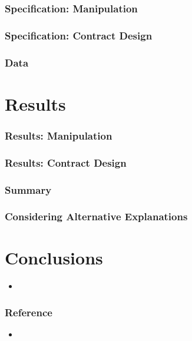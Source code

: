 \documentclass[dvipdfmx,12pt]{beamer}
\begin{document}
\begin{frame}\frametitle{Specification: Manipulation}

\end{frame}

\begin{frame}\frametitle{Specification: Contract Design}

\end{frame}

\begin{frame}\frametitle{Data}

\end{frame}

\section{Results}
\begin{frame}\frametitle{Results: Manipulation}

\end{frame}

\begin{frame}\frametitle{}

\end{frame}

\begin{frame}\frametitle{Results: Contract Design}

\end{frame}

\begin{frame}\frametitle{}

\end{frame}

\begin{frame}\frametitle{Summary}

\end{frame}

\begin{frame}\frametitle{Considering Alternative Explanations}

\end{frame}

\section{Conclusions}
\begin{frame}
  \begin{itemize}
    \item 
  \end{itemize}
\end{frame}

\begin{frame}\frametitle{Reference}
  \footnotesize
  \begin{itemize}
    \item
  \end{itemize}
\end{frame}
\end{document}
